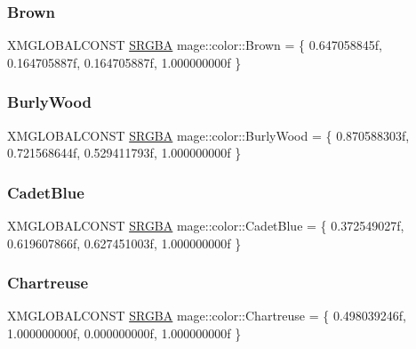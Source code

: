 \hypertarget{namespacemage_1_1color_a5e4deb01ea5fe6d419507d0a934b2c2e}{}\label{namespacemage_1_1color_a5e4deb01ea5fe6d419507d0a934b2c2e} 
\subsubsection{\texorpdfstring{Brown}{Brown}}
{\footnotesize\ttfamily X\+M\+G\+L\+O\+B\+A\+L\+C\+O\+N\+ST \hyperlink{structmage_1_1_s_r_g_b_a}{S\+R\+G\+BA} mage\+::color\+::\+Brown = \{ 0.\+647058845f, 0.\+164705887f, 0.\+164705887f, 1.\+000000000f \}}

\hypertarget{namespacemage_1_1color_af7eaff8744af0f0e21ff49edea44c0d4}{}\label{namespacemage_1_1color_af7eaff8744af0f0e21ff49edea44c0d4} 
\subsubsection{\texorpdfstring{Burly\+Wood}{BurlyWood}}
{\footnotesize\ttfamily X\+M\+G\+L\+O\+B\+A\+L\+C\+O\+N\+ST \hyperlink{structmage_1_1_s_r_g_b_a}{S\+R\+G\+BA} mage\+::color\+::\+Burly\+Wood = \{ 0.\+870588303f, 0.\+721568644f, 0.\+529411793f, 1.\+000000000f \}}

\hypertarget{namespacemage_1_1color_a8f65ce7d8851e033982b2b8266547c6d}{}\label{namespacemage_1_1color_a8f65ce7d8851e033982b2b8266547c6d} 
\subsubsection{\texorpdfstring{Cadet\+Blue}{CadetBlue}}
{\footnotesize\ttfamily X\+M\+G\+L\+O\+B\+A\+L\+C\+O\+N\+ST \hyperlink{structmage_1_1_s_r_g_b_a}{S\+R\+G\+BA} mage\+::color\+::\+Cadet\+Blue = \{ 0.\+372549027f, 0.\+619607866f, 0.\+627451003f, 1.\+000000000f \}}

\hypertarget{namespacemage_1_1color_aa07af7621f6070d32d7846379e1a1ef3}{}\label{namespacemage_1_1color_aa07af7621f6070d32d7846379e1a1ef3} 
\subsubsection{\texorpdfstring{Chartreuse}{Chartreuse}}
{\footnotesize\ttfamily X\+M\+G\+L\+O\+B\+A\+L\+C\+O\+N\+ST \hyperlink{structmage_1_1_s_r_g_b_a}{S\+R\+G\+BA} mage\+::color\+::\+Chartreuse = \{ 0.\+498039246f, 1.\+000000000f, 0.\+000000000f, 1.\+000000000f \}}

